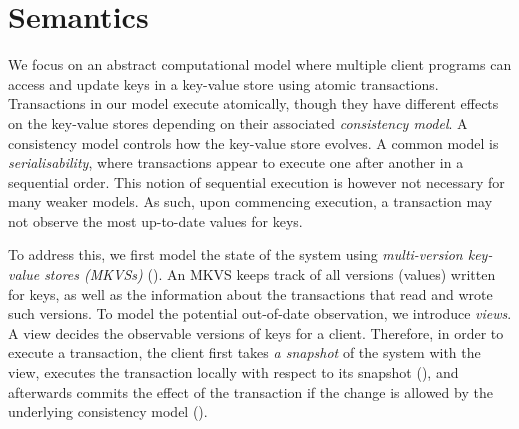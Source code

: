 \section{Semantics}
\label{sec:semantics}

We focus on an abstract computational model where multiple client programs can access and update keys in a key-value store using atomic transactions. 
Transactions in our model execute atomically, though they have different effects on the key-value stores depending on their associated \emph{consistency model}.
A consistency model controls how the key-value store evolves.
A common model is \emph{serialisability}, where transactions appear to execute one after another in a sequential order.
This notion of sequential execution is however not necessary for many weaker models. As such, upon commencing execution, a transaction may not observe the most up-to-date values for keys. 

To address this, we first model the state of the system using \emph{multi-version key-value stores (MKVSs)} (). 
An MKVS keeps track of all versions (values) written for keys, as well as the information about the transactions that read and wrote such versions. 
To model the potential out-of-date observation, we introduce \emph{views}.
A view decides the observable versions of keys for a client.
Therefore, in order to execute a transaction, the client first takes \emph{a snapshot} of the system with the view, executes the transaction locally with respect to its snapshot (), and afterwards commits the effect of the transaction if the change is allowed by the underlying consistency model ().








